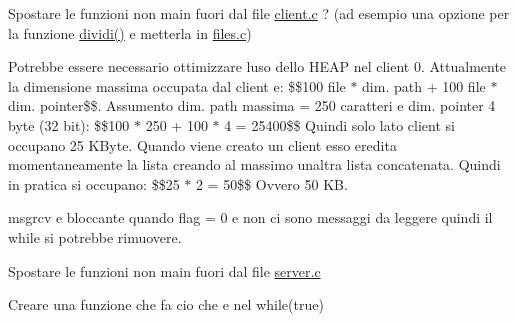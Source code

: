 
\begin{DoxyRefList}
\item[\label{todo__todo000001}%
\Hypertarget{todo__todo000001}%
File \hyperlink{client_8c}{client.c} ]Spostare le funzioni non main fuori dal file \hyperlink{client_8c}{client.\+c} ? (ad esempio una opzione per la funzione \hyperlink{client_8c_a55586f2b7e9b3620294cf78cda8abdad}{dividi()} e\textquotesingle{} metterla in \hyperlink{files_8c}{files.\+c})  
\item[\label{todo__todo000002}%
\Hypertarget{todo__todo000002}%
Globale \hyperlink{client_8h_a8c7084a254c7cd640d66e647795ff8f6}{operazioni\+\_\+client0} ()]Potrebbe essere necessario ottimizzare l\textquotesingle{}uso dello H\+E\+AP nel client 0. Attualmente la dimensione massima occupata dal client e\textquotesingle{}\+: \$\$100 file $\ast$ dim. path + 100 file $\ast$ dim. pointer\$\$. Assumento dim. path massima = 250 caratteri e dim. pointer 4 byte (32 bit)\+: \$\$100 $\ast$ 250 + 100 $\ast$ 4 = 25400\$\$ Quindi solo lato client si occupano 25 K\+Byte. Quando viene creato un client esso eredita momentaneamente la lista creando al massimo un\textquotesingle{}altra lista concatenata. Quindi in pratica si occupano\+: \$\$25 $\ast$ 2 = 50\$\$ Ovvero 50 KB.

msgrcv e\textquotesingle{} bloccante quando flag = 0 e non ci sono messaggi da leggere quindi il while si potrebbe rimuovere. 
\item[\label{todo__todo000004}%
\Hypertarget{todo__todo000004}%
File \hyperlink{server_8c}{server.c} ]Spostare le funzioni non main fuori dal file \hyperlink{server_8c}{server.\+c} 

Creare una funzione che fa cio\textquotesingle{} che e\textquotesingle{} nel while(true)
\end{DoxyRefList}